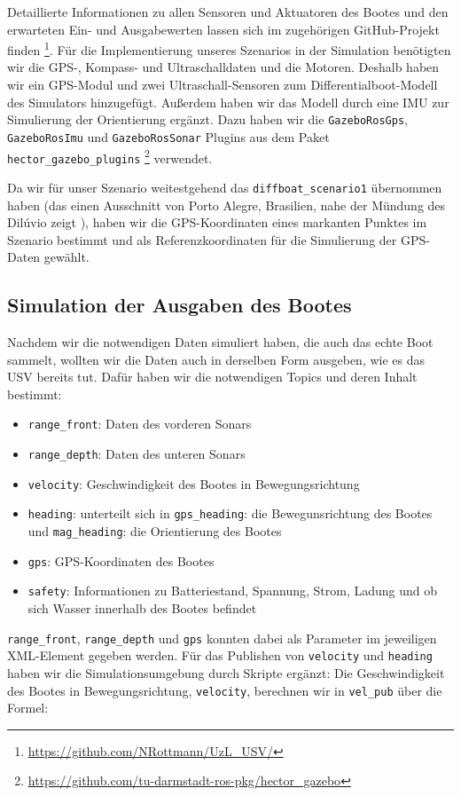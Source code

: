 \documentclass[11pt]{article}
\begin{document}
Detaillierte Informationen zu allen Sensoren und Aktuatoren des Bootes und den erwarteten Ein- und Ausgabewerten lassen sich im zugehörigen GitHub-Projekt finden \footnote{\url{https://github.com/NRottmann/UzL_USV/}}.
Für die Implementierung unseres Szenarios in der Simulation benötigten wir die GPS-, Kompass- und Ultraschalldaten und die Motoren. Deshalb haben wir ein GPS-Modul und zwei Ultraschall-Sensoren zum Differentialboot-Modell des Simulators hinzugefügt. Außerdem haben wir das Modell durch eine IMU zur Simulierung der Orientierung ergänzt. Dazu haben wir die \texttt{GazeboRosGps}, \texttt{GazeboRosImu} und \texttt{GazeboRosSonar} Plugins aus dem Paket \texttt{hector\_gazebo\_plugins}  \footnote{\url{https://github.com/tu-darmstadt-ros-pkg/hector_gazebo}} verwendet.


Da wir für unser Szenario weitestgehend das \texttt{diffboat\_scenario1} übernommen haben (das einen Ausschnitt von Porto Alegre, Brasilien, nahe der Mündung des Dilúvio zeigt \cite{paravisi2019}), haben wir die GPS-Koordinaten eines markanten Punktes im Szenario bestimmt und als Referenzkoordinaten für die Simulierung der GPS-Daten gewählt.

\subsection{Simulation der Ausgaben des Bootes}

Nachdem wir die notwendigen Daten simuliert haben, die auch das echte Boot sammelt, wollten wir die Daten auch in derselben Form ausgeben, wie es das USV bereits tut. Dafür haben wir die notwendigen Topics und deren Inhalt bestimmt:

\begin{itemize}
	\item \texttt{range\_front}: Daten des vorderen Sonars
	\item \texttt{range\_depth}: Daten des unteren Sonars
	\item \texttt{velocity}: Geschwindigkeit des Bootes in Bewegungsrichtung
	\item \texttt{heading}: unterteilt sich in \texttt{gps\_heading}: die Bewegunsrichtung des Bootes und \texttt{mag\_heading}: die Orientierung des Bootes
	\item \texttt{gps}: GPS-Koordinaten des Bootes
	\item \texttt{safety}: Informationen zu Batteriestand, Spannung, Strom, Ladung und ob sich Wasser innerhalb des Bootes befindet
\end{itemize}
\texttt{range\_front}, \texttt{range\_depth} und \texttt{gps} konnten dabei als Parameter im jeweiligen XML-Element gegeben werden. Für das Publishen von \texttt{velocity} und \texttt{heading} haben wir die Simulationsumgebung durch Skripte ergänzt:
Die Geschwindigkeit des Bootes in Bewegungsrichtung, \texttt{velocity}, berechnen wir in \texttt{vel\_pub} über die Formel:
\end{document}
